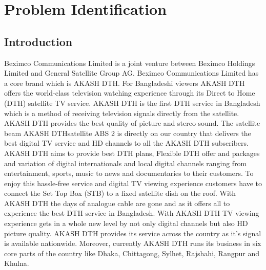 \chapter{Problem Identification}
\begin{spacing}{1.0}
\setlength{\parskip}{0.3in}
\graphicspath{{./Chapter1/}}

\section{Introduction}
Beximco Communications Limited is a joint venture between Beximco Holdings Limited and General Satellite Group AG. Beximco Communications Limited has a core brand which is AKASH DTH. For Bangladeshi viewers AKASH DTH offers the world-class television watching experience through its Direct to Home (DTH) satellite TV service. AKASH DTH is the first DTH service in Bangladesh which is a method of receiving television signals directly from the satellite. AKASH DTH provides the best quality of picture and stereo sound. The satellite beam AKASH DTHsatellite ABS 2 is directly on our country that delivers the best digital TV service and HD channels to all the AKASH DTH subscribers. AKASH DTH aims to provide best DTH plans, Flexible DTH offer and packages and variation of digital internationals and local digital channels ranging from entertainment, sports, music to news and documentaries to their customers. To enjoy this hassle-free service and digital TV viewing experience customers have to connect the Set Top Box (STB) to a fixed satellite dish on the roof. With AKASH DTH the days of analogue cable are gone and as it offers all to experience the best DTH service in Bangladesh. With AKASH DTH TV viewing experience gets in a whole new level by not only digital channels but also HD picture quality. AKASH DTH provides its service across the country as it’s signal is available nationwide. Moreover, currently AKASH DTH runs its business in six core parts of the country like Dhaka, Chittagong, Sylhet, Rajshahi, Rangpur and Khulna.

\end{spacing}
